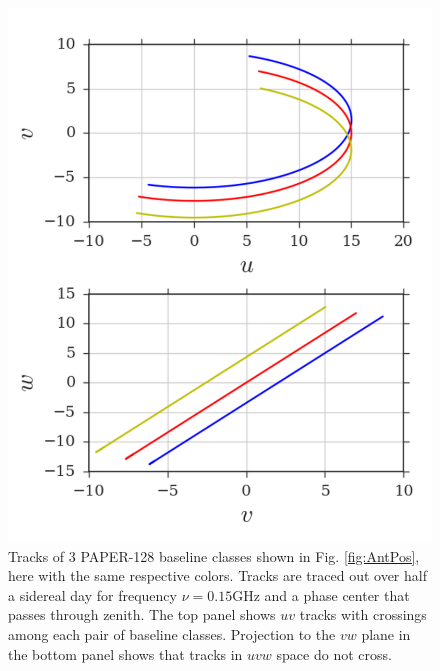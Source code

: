 \documentclass[twocolumn,apj,numberedappendix]{emulateapj}
\renewcommand\[{\begin{equation}}
\renewcommand\]{\end{equation}}
\begin{document}
\begin{figure}[h]
\includegraphics[width=\linewidth]{rotation_new}
\caption{Tracks of 3 PAPER-128 baseline classes shown in Fig. \ref{fig:AntPos}, here with the same respective colors. Tracks are traced out over half a sidereal day for frequency $\nu=0.15\text{GHz}$ and a phase center that passes through zenith. The top panel shows $uv$ tracks with crossings among each pair of baseline classes. Projection to the $vw$ plane in the bottom panel shows that tracks in $uvw$ space do not cross. }
\label{fig:Tracks}
\end{figure}
\end{document}
